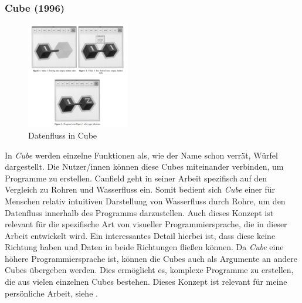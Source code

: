 \documentclass[ngerman]{article}
\begin{document}
\subsubsection{Cube (1996)}

\begingroup
\setlength\intextsep{2pt}

\begin{minipage}{\linewidth}
\begin{figure}
  \centering
  \includegraphics[width=0.4\textwidth]{./graphics/cube_vpl.png} %
  \caption{Datenfluss in Cube \cite{najork1996programming}}
  \label{fig:cube_demo}
\end{figure}
    \cite{najork1996programming}
In \textit{Cube} werden einzelne Funktionen als, wie der Name schon verrät, Würfel dargestellt. Die Nutzer/innen können diese Cubes miteinander verbinden, um Programme zu erstellen.
  Canfield geht in seiner Arbeit spezifisch auf den Vergleich zu Rohren und Wasserfluss ein. Somit bedient sich \textit{Cube} einer für Menschen relativ intuitiven Darstellung von Wasserfluss durch Rohre, um den Datenfluss innerhalb des Programms darzustellen. Auch dieses Konzept ist relevant für die spezifische Art von visueller Programmiersprache, die in dieser Arbeit entwickelt wird.
  Ein interessantes Detail hierbei ist, dass diese  keine Richtung haben und Daten in beide Richtungen fließen können. 
Da \textit{Cube} eine höhere Programmiersprache ist, können die Cubes auch als Argumente an andere Cubes übergeben werden. Dies ermöglicht es, komplexe Programme zu erstellen, die aus vielen einzelnen Cubes bestehen. 
\br
Dieses Konzept ist relevant für meine persönliche Arbeit, siehe .

\end{minipage}
\endgroup
\pagebreak
\end{document}
